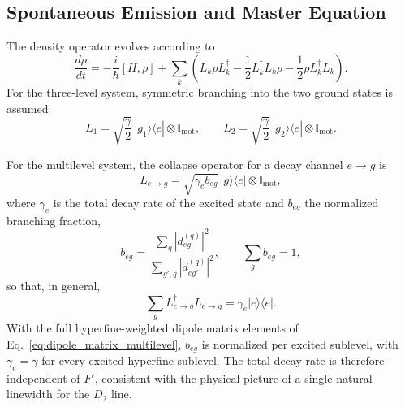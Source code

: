 \subsection{Spontaneous Emission and Master Equation}
\label{subsec:master_equation_numerical}

The density operator evolves according to
\begin{equation}
    \frac{d\rho}{dt}
    =
    -\frac{i}{\hbar}[H,\rho]
    +
    \sum_k
    \left(
        L_k\rho L_k^\dagger
        -
        \frac{1}{2}
        L_k^\dagger L_k\rho
        -
        \frac{1}{2}
        \rho L_k^\dagger L_k
    \right).
    \label{eq:lindblad_numerical}
\end{equation}
For the three-level system, symmetric branching into the two ground states is assumed:
\begin{equation}
    L_1
    =
    \sqrt{\frac{\gamma}{2}}\,
    |g_1\rangle\langle e|
    \otimes\mathbb I_{\mathrm{mot}},
    \qquad
    L_2
    =
    \sqrt{\frac{\gamma}{2}}\,
    |g_2\rangle\langle e|
    \otimes\mathbb I_{\mathrm{mot}}.
    \label{eq:three_level_collapse}
\end{equation}

For the multilevel system, the collapse operator for a decay channel $e\rightarrow g$ is
\begin{equation}
    L_{e\rightarrow g}
    =
    \sqrt{\gamma_e b_{eg}}\,
    |g\rangle\langle e|
    \otimes\mathbb I_{\mathrm{mot}},
    \label{eq:multilevel_collapse}
\end{equation}
where $\gamma_e$ is the total decay rate of the excited state and $b_{eg}$ the normalized branching fraction,
\begin{equation}
    b_{eg}
    =
    \frac{\displaystyle
        \sum_q\left|d_{eg}^{(q)}\right|^2}
    {\displaystyle
        \sum_{g',q}\left|d_{eg'}^{(q)}\right|^2},
    \qquad
    \sum_g b_{eg}=1,
    \label{eq:branching_fraction}
\end{equation}
so that, in general,
\begin{equation}
    \sum_g
    L_{e\rightarrow g}^\dagger
    L_{e\rightarrow g}
    =
    \gamma_e|e\rangle\langle e|.
\end{equation}
With the full hyperfine-weighted dipole matrix elements of Eq.~\eqref{eq:dipole_matrix_multilevel}, $b_{eg}$ is normalized per excited sublevel, with $\gamma_e=\gamma$ for every excited hyperfine sublevel. The total decay rate is therefore independent of $F'$, consistent with the physical picture of a single natural linewidth for the $D_2$ line.

